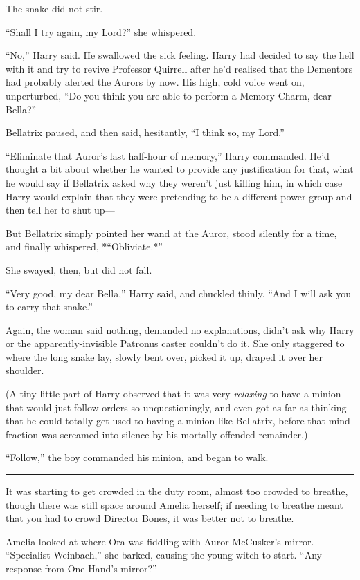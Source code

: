 The snake did not stir.

``Shall I try again, my Lord?'' she whispered.

``No,'' Harry said. He swallowed the sick feeling. Harry had decided to
say the hell with it and try to revive Professor Quirrell after he'd
realised that the Dementors had probably alerted the Aurors by now. His
high, cold voice went on, unperturbed, ``Do you think you are able to
perform a Memory Charm, dear Bella?''

Bellatrix paused, and then said, hesitantly, ``I think so, my Lord.''

``Eliminate that Auror's last half-hour of memory,'' Harry commanded.
He'd thought a bit about whether he wanted to provide any justification
for that, what he would say if Bellatrix asked why they weren't just
killing him, in which case Harry would explain that they were pretending
to be a different power group and then tell her to shut up---

But Bellatrix simply pointed her wand at the Auror, stood silently for a
time, and finally whispered, *``Obliviate.*''

She swayed, then, but did not fall.

``Very good, my dear Bella,'' Harry said, and chuckled thinly. ``And I
will ask you to carry that snake.''

Again, the woman said nothing, demanded no explanations, didn't ask why
Harry or the apparently-invisible Patronus caster couldn't do it. She
only staggered to where the long snake lay, slowly bent over, picked it
up, draped it over her shoulder.

(A tiny little part of Harry observed that it was very \emph{relaxing}
to have a minion that would just follow orders so unquestioningly, and
even got as far as thinking that he could totally get used to having a
minion like Bellatrix, before that mind-fraction was screamed into
silence by his mortally offended remainder.)

``Follow,'' the boy commanded his minion, and began to walk.

\begin{center}\rule{3in}{0.4pt}\end{center}

It was starting to get crowded in the duty room, almost too crowded to
breathe, though there was still space around Amelia herself; if needing
to breathe meant that you had to crowd Director Bones, it was better not
to breathe.

Amelia looked at where Ora was fiddling with Auror McCusker's mirror.
``Specialist Weinbach,'' she barked, causing the young witch to start.
``Any response from One-Hand's mirror?''

